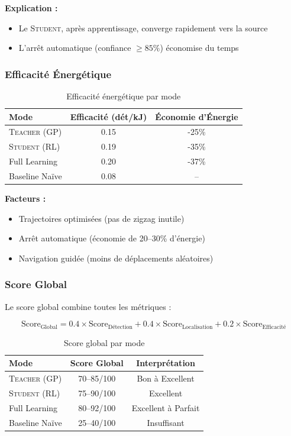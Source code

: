 \documentclass[12pt,a4paper]{article}
\newcommand{\teacher}{\textsc{Teacher}}
\newcommand{\student}{\textsc{Student}}
\newcommand{\gp}{\textsc{GP}}
\newcommand{\rl}{\textsc{RL}}
\begin{document}
\textbf{Explication :}
\begin{itemize}
    \item Le \student{}, après apprentissage, converge rapidement vers la source
    \item L'arrêt automatique (confiance $\geq 85\%$) économise du temps
\end{itemize}

\subsubsection{Efficacité Énergétique}

\begin{table}[H]
\centering
\begin{tabular}{lcc}
\toprule
\textbf{Mode} & \textbf{Efficacité (dét/kJ)} & \textbf{Économie d'Énergie} \\
\midrule
\teacher{} (\gp{}) & 0.15 & -25\% \\
\student{} (\rl{}) & 0.19 & -35\% \\
Full Learning & 0.20 & -37\% \\
Baseline Naïve & 0.08 & -- \\
\bottomrule
\end{tabular}
\caption{Efficacité énergétique par mode}
\end{table}

\textbf{Facteurs :}
\begin{itemize}
    \item Trajectoires optimisées (pas de zigzag inutile)
    \item Arrêt automatique (économie de 20--30\% d'énergie)
    \item Navigation guidée (moins de déplacements aléatoires)
\end{itemize}

\subsubsection{Score Global}

Le score global combine toutes les métriques :

\begin{equation}
\text{Score}_{\text{Global}} = 0.4 \times \text{Score}_{\text{Détection}} + 0.4 \times \text{Score}_{\text{Localisation}} + 0.2 \times \text{Score}_{\text{Efficacité}}
\end{equation}

\begin{table}[H]
\centering
\begin{tabular}{lcc}
\toprule
\textbf{Mode} & \textbf{Score Global} & \textbf{Interprétation} \\
\midrule
\teacher{} (\gp{}) & 70--85/100 & Bon à Excellent \\
\student{} (\rl{}) & 75--90/100 & Excellent \\
Full Learning & 80--92/100 & Excellent à Parfait \\
Baseline Naïve & 25--40/100 & Insuffisant \\
\bottomrule
\end{tabular}
\caption{Score global par mode}
\end{table}
\end{document}
